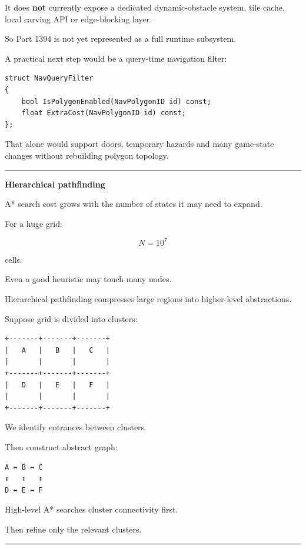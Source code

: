 It does \textbf{not} currently expose a dedicated dynamic-obstacle system, tile cache, local carving API or edge-blocking layer.

So Part 1394 is not yet represented as a full runtime subsystem.

A practical next step would be a query-time navigation filter:

\begin{verbatim}
struct NavQueryFilter
{
    bool IsPolygonEnabled(NavPolygonID id) const;
    float ExtraCost(NavPolygonID id) const;
};
\end{verbatim}

That alone would support doors, temporary hazards and many game-state changes without rebuilding polygon topology.

\begin{center}\rule{0.5\linewidth}{0.5pt}\end{center}

\textbf{Hierarchical pathfinding}

A* search cost grows with the number of states it may need to expand.

For a huge grid:

\[
N=10^7
\]

cells.

Even a good heuristic may touch many nodes.

Hierarchical pathfinding compresses large regions into higher-level abstractions.

Suppose grid is divided into clusters:

\begin{verbatim}
+-------+-------+-------+
|   A   |   B   |   C   |
|       |       |       |
+-------+-------+-------+
|   D   |   E   |   F   |
|       |       |       |
+-------+-------+-------+
\end{verbatim}

We identify entrances between clusters.

Then construct abstract graph:

\begin{verbatim}
A ↔ B ↔ C
↕   ↕   ↕
D ↔ E ↔ F
\end{verbatim}

High-level A* searches cluster connectivity first.

Then refine only the relevant clusters.

\begin{center}\rule{0.5\linewidth}{0.5pt}\end{center}

